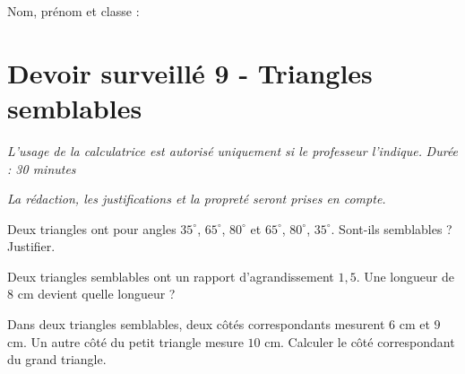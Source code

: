 \documentclass[a4paper,10pt]{report}
\begin{document}
\pagestyle{empty}
\noindent Nom, prénom et classe : \dotfill

\section*{Devoir surveillé 9 - Triangles semblables}

\noindent \textit{L'usage de la calculatrice est autorisé uniquement si le professeur l'indique.} \hfill \textit{Durée : 30 minutes}

\medskip
\noindent \textit{La rédaction, les justifications et la propreté seront prises en compte.}


\begin{ex}[Reconnaître]
Deux triangles ont pour angles $35^\circ$, $65^\circ$, $80^\circ$ et $65^\circ$, $80^\circ$, $35^\circ$. Sont-ils semblables ? Justifier.
\medskip\noindent\grandscarreaux{\linewidth}{3cm}
\end{ex}
\begin{ex}[Rapport]
Deux triangles semblables ont un rapport d'agrandissement $1,5$. Une longueur de $8$ cm devient quelle longueur ?
\medskip\noindent\grandscarreaux{\linewidth}{3cm}
\end{ex}
\begin{ex}
Dans deux triangles semblables, deux côtés correspondants mesurent $6$ cm et $9$ cm. Un autre côté du petit triangle mesure $10$ cm. Calculer le côté correspondant du grand triangle.
\medskip\noindent\grandscarreaux{\linewidth}{4cm}
\end{ex}
\end{document}
